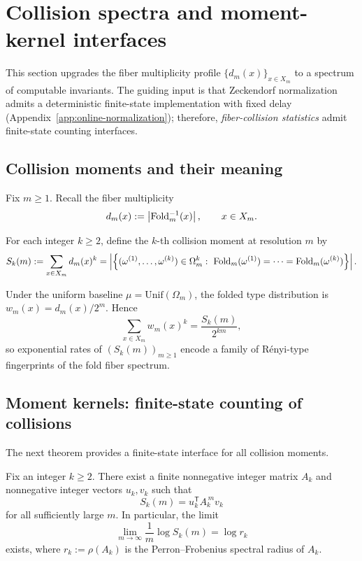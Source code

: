 \section{Collision spectra and moment-kernel interfaces}\label{sec:collision-spectra}

This section upgrades the fiber multiplicity profile $\{d_m(x)\}_{x\in X_m}$ to a spectrum of computable invariants.
The guiding input is that Zeckendorf normalization admits a deterministic finite-state implementation with fixed delay (Appendix~\ref{app:online-normalization}); therefore, \emph{fiber-collision statistics} admit finite-state counting interfaces.

\subsection{Collision moments and their meaning}\label{subsec:collision-defs}
Fix $m\ge 1$.
Recall the fiber multiplicity
\[
d_m(x):=\left\lvert \mathrm{Fold}_m^{-1}(x)\right\rvert,\qquad x\in X_m.
\]

\begin{definition}\label{def:collision-moments}
For each integer $k\ge 2$, define the $k$-th collision moment at resolution $m$ by
\[
S_k(m):=\sum_{x\in X_m} d_m(x)^k
=\card{\Bigl\{(\omega^{(1)},\dots,\omega^{(k)})\in\Omega_m^k:\ \Fold_m(\omega^{(1)})=\cdots=\Fold_m(\omega^{(k)})\Bigr\}}.
\]
\end{definition}

\begin{remark}\label{rem:collision-renyi}
Under the uniform baseline $\mu=\mathrm{Unif}(\Omega_m)$, the folded type distribution is
\(
w_m(x)=d_m(x)/2^m
\).
Hence
\[
\sum_{x\in X_m} w_m(x)^k=\frac{S_k(m)}{2^{km}},
\]
so exponential rates of $(S_k(m))_{m\ge 1}$ encode a family of R\'enyi-type fingerprints of the fold fiber spectrum.
\end{remark}

\subsection{Moment kernels: finite-state counting of collisions}\label{subsec:moment-kernel}
The next theorem provides a finite-state interface for all collision moments.

\begin{theorem}\label{thm:moment-kernel-collisions}
Fix an integer $k\ge 2$.
There exist a finite nonnegative integer matrix $A_k$ and nonnegative integer vectors $u_k,v_k$ such that
\begin{equation}\label{eq:Sk-matrix-coefficient}
S_k(m)=u_k^{\mathsf T}A_k^{\,m}v_k
\end{equation}
for all sufficiently large $m$.
In particular, the limit
\[
\lim_{m\to\infty}\frac{1}{m}\log S_k(m)=\log r_k
\]
exists, where $r_k:=\rho(A_k)$ is the Perron--Frobenius spectral radius of $A_k$.
\end{theorem}

